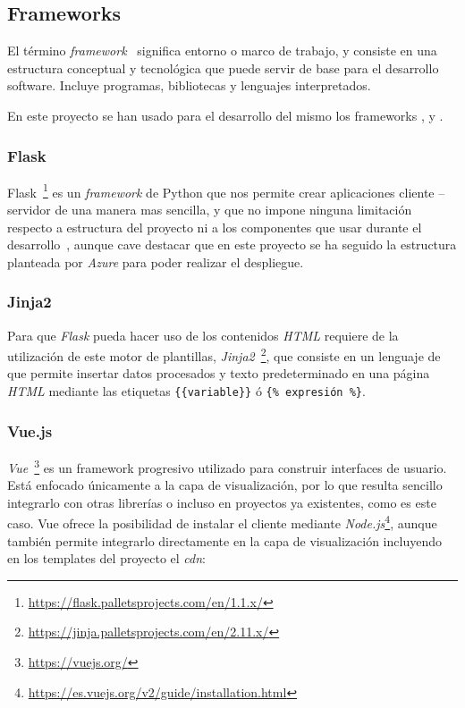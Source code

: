 \subsection{Frameworks}
El término \textit{framework}~\cite{wiki:framework} significa entorno o marco de trabajo, y consiste en una estructura conceptual y tecnológica que puede servir de base para el desarrollo software. Incluye programas, bibliotecas y lenguajes interpretados.


En este proyecto se han usado para el desarrollo del mismo los frameworks ,  y .


\subsubsection{Flask}\label{sub:flask}
Flask~\footnote{\url{https://flask.palletsprojects.com/en/1.1.x/}} es un \textit{framework} de Python que nos permite crear aplicaciones cliente -- servidor de una manera mas sencilla, y que no impone ninguna limitación respecto a estructura del proyecto ni a los componentes que usar durante el desarrollo~\cite{grinberg2014flask}, aunque cave destacar que en este proyecto se ha seguido la estructura planteada por \textit{Azure} para poder realizar el despliegue.

\subsubsection{Jinja2}\label{sub:jinja}
Para que \textit{Flask} pueda hacer uso de los contenidos \textit{HTML} requiere de la utilización de este motor de plantillas, \textit{Jinja2}~\footnote{\url{https://jinja.palletsprojects.com/en/2.11.x/}}, que consiste en un lenguaje de que permite insertar datos procesados y texto predeterminado en una página \textit{HTML} mediante las etiquetas \verb|{{variable}}| ó \verb|{% expresión %}|.


\subsubsection{Vue.js}\label{sub:vue}
\textit{Vue}~\footnote{\url{https://vuejs.org/}} es un framework progresivo utilizado para construir interfaces de usuario. Está enfocado únicamente a la capa de visualización, por lo que resulta sencillo integrarlo con otras librerías o incluso en proyectos ya existentes, como es este caso.
Vue ofrece la posibilidad de instalar el cliente mediante \textit{Node.js}\footnote{\url{https://es.vuejs.org/v2/guide/installation.html}}, aunque también permite integrarlo directamente en la capa de visualización incluyendo en los templates del proyecto el \textit{cdn}:

